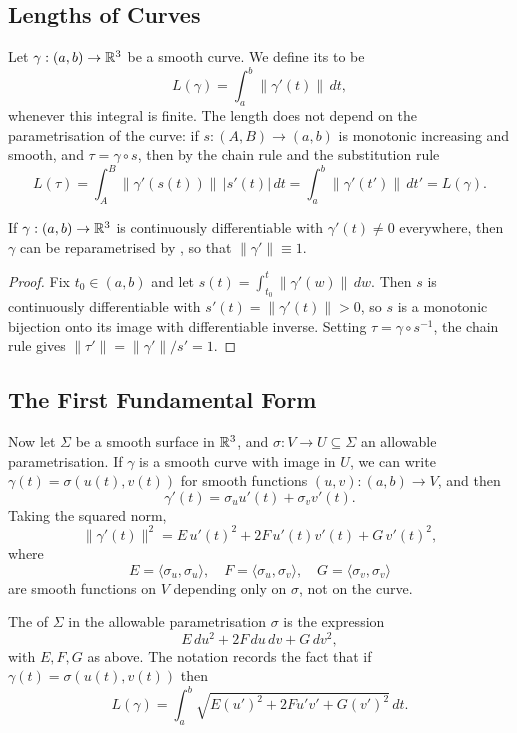 \documentclass[a4paper]{scrartcl}
\begin{document}
\subsection{Lengths of Curves}

Let $\gamma: (a, b) \rightarrow \mathbb{R}^3$ be a smooth curve. We define its  to be
$$
L(\gamma) = \int_a^b \|\gamma'(t)\| \, dt,
$$
whenever this integral is finite. The length does not depend on the parametrisation of the curve: if $s: (A, B) \rightarrow (a, b)$ is monotonic increasing and smooth, and $\tau = \gamma \circ s$, then by the chain rule and the substitution rule
$$
L(\tau) = \int_A^B \|\gamma'(s(t))\| \, |s'(t)| \, dt = \int_a^b \|\gamma'(t')\| \, dt' = L(\gamma).
$$

\begin{lemma}
    If $\gamma: (a, b) \rightarrow \mathbb{R}^3$ is continuously differentiable with $\gamma'(t) \neq 0$ everywhere, then $\gamma$ can be reparametrised by , so that $\|\gamma'\| \equiv 1$.
\end{lemma}
\begin{proof}
    Fix $t_0 \in (a,b)$ and let $s(t) = \int_{t_0}^t \|\gamma'(w)\|\, dw$. Then $s$ is continuously differentiable with $s'(t) = \|\gamma'(t)\| > 0$, so $s$ is a monotonic bijection onto its image with differentiable inverse. Setting $\tau = \gamma \circ s^{-1}$, the chain rule gives $\|\tau'\| = \|\gamma'\| / s' = 1$.
\end{proof}

\subsection{The First Fundamental Form}

Now let $\Sigma$ be a smooth surface in $\mathbb{R}^3$, and $\sigma: V \rightarrow U \subseteq \Sigma$ an allowable parametrisation. If $\gamma$ is a smooth curve with image in $U$, we can write $\gamma(t) = \sigma(u(t), v(t))$ for smooth functions $(u, v): (a,b) \rightarrow V$, and then
$$
\gamma'(t) = \sigma_u u'(t) + \sigma_v v'(t).
$$
Taking the squared norm,
$$
\|\gamma'(t)\|^2 = E \, u'(t)^2 + 2F\, u'(t) v'(t) + G \, v'(t)^2,
$$
where
$$
E = \langle \sigma_u, \sigma_u \rangle, \quad F = \langle \sigma_u, \sigma_v \rangle, \quad G = \langle \sigma_v, \sigma_v \rangle
$$
are smooth functions on $V$ depending only on $\sigma$, not on the curve.

\begin{definition}
    The  of $\Sigma$ in the allowable parametrisation $\sigma$ is the expression
    $$
    E \, du^2 + 2F \, du \, dv + G \, dv^2,
    $$
    with $E, F, G$ as above. The notation records the fact that if $\gamma(t) = \sigma(u(t), v(t))$ then
    $$
    L(\gamma) = \int_a^b \sqrt{E (u')^2 + 2 F u' v' + G (v')^2} \, dt.
    $$
\end{definition}
\end{document}
